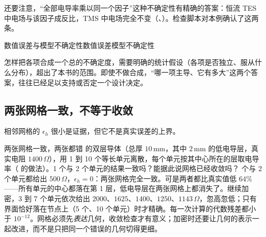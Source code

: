 还要注意，“全部电导率乘以同一个因子”这种不确定性有精确的答案：恒流 TES 中电场与该因子成反比，TMS 中电场完全不变（、）。检查脚本对本例确认了这两条。

\begin{compare}{数值误差与模型不确定性}{数值误差}{模型不确定性}
\end{compare}

怎样把各项合成一个总的不确定度，需要明确的统计假设（各项是否独立、服从什么分布），超出了本书的范围。即使不做合成，“哪一项主导、它有多大”这两个答案，往往已经足以支持或否定一个设计决定。

\subsection{两张网格一致，不等于收敛}
相邻网格的 $\epsilon_h$ 很小是证据，但它不是真实误差的上界。

\begin{example}[label=ex:practice-twomesh]{两张网格一致，两张都错}
 的双层导体（总厚 $10\,\mathrm{mm}$，其中 $2\,\mathrm{mm}$ 的低电导层，真实电阻 $1400\,\Omega$），用 1 到 10 个等长单元离散，每个单元按其中心所在的层取电导率（ 的做法）。1 个与 2 个单元的结果一致吗？能据此说网格已经收敛吗？
 个与 2 个单元都给出 $500\,\Omega$，$\epsilon_h=0$：两张网格完全一致。可是两者都比真实值低 $64\%$——所有单元的中心都落在第 1 层，低电导层在两张网格上都消失了。继续加密，3 到 7 个单元依次给出 $2000$、$1625$、$1400$、$1250$、$1143\,\Omega$，忽高忽低；只有界面恰好落在节点上（5 个、10 个单元）时才精确。每一次计算的代数残差都小于 $10^{-12}$。网格必须先\emph{表达}几何，收敛检查才有意义；加密时还要让几何的表示一起改进，而不是只把同一个错误的几何切得更细。
\end{example}


